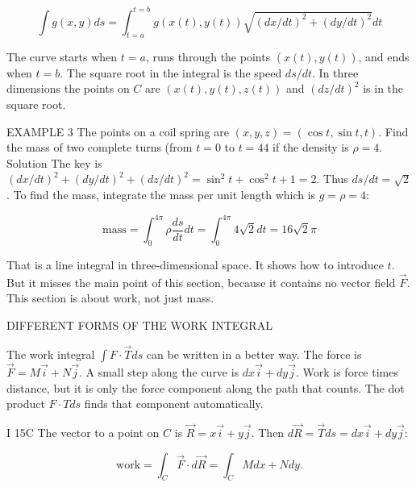 $$\int g(x,y)ds=\int_{t=a}^{t=b}g(x(t),y(t))\sqrt{(dx/dt)^2+(dy/dt)^2}dt$$

The curve starts when $t = a$, runs through the points $(x(t), y(t))$, and ends when $t = b$.
The square root in the integral is the speed $ds/dt$. In three dimensions the points on
$C$ are $(x(t), y(t), z(t))$ and $(dz/dt)^2$ is in the square root.

EXAMPLE 3 The points on a coil spring are $(x, y, z) = (\cos t, \sin t, t)$. Find the mass
of two complete turns (from $t = 0$ to $t = 44$ if the density is $\rho = 4$.
Solution The key is $(dx/dt)^2 + (dy/dt)^2 + (dz/dt)^2 = \sin^2 t + \cos^2 t + 1 = 2$. Thus
$ds/dt = \sqrt{2}$. To find the mass, integrate the mass per unit length which is $g = \rho = 4$:

$$\text{mass}=\int_0^{4\pi}\rho \dfrac{ds}{dt}dt=\int_0^{4\pi}4\sqrt{2}dt=16\sqrt{2}\pi$$

That is a line integral in three-dimensional space. It shows how to introduce $t$. But
it misses the main point of this section, because it contains no vector field $\vec F$. This
section is about work, not just mass.

DIFFERENT FORMS OF THE WORK INTEGRAL

The work integral $\int F \cdot \vec T ds$ can be written in a better way. The force is $\vec F = M\vec i + N\vec j$.
A small step along the curve is $dx \vec i + dy \vec j$. Work is force times distance, but it is only
the force component along the path that counts. The dot product $F\cdot T ds$ finds that
component automatically. 

I 15C The vector to a point on $C$ is $\vec R = x\vec i + y\vec j$. Then $d\vec R = \vec T ds = dx \vec i + dy \vec j$:

$$\text{work}=\int_C\vec F \cdot d\vec R=\int_C M dx+N dy.$$ 

